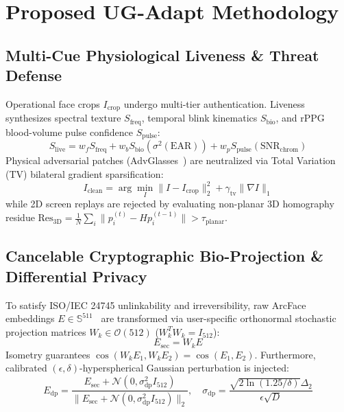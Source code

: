 \documentclass[conference]{IEEEtran}
\begin{document}
\section{Proposed UG-Adapt Methodology}

\subsection{Multi-Cue Physiological Liveness \& Threat Defense}
Operational face crops $I_{\text{crop}}$ undergo multi-tier authentication. Liveness synthesizes spectral texture $S_{\text{freq}}$, temporal blink kinematics $S_{\text{bio}}$, and rPPG blood-volume pulse confidence $S_{\text{pulse}}$:
\begin{equation}
S_{\text{live}} = w_f S_{\text{freq}} + w_b S_{\text{bio}}(\sigma^2(\text{EAR})) + w_p S_{\text{pulse}}(\text{SNR}_{\text{chrom}})
\end{equation}
Physical adversarial patches (AdvGlasses~\cite{sharif2016accessorize}) are neutralized via Total Variation (TV) bilateral gradient sparsification:
\begin{equation}
I_{\text{clean}} = \arg\min_{I} \|I - I_{\text{crop}}\|_2^2 + \gamma_{\text{tv}} \|\nabla I\|_1
\end{equation}
while 2D screen replays are rejected by evaluating non-planar 3D homography residue $\text{Res}_{3\text{D}} = \frac{1}{N}\sum_i \|p_i^{(t)} - H p_i^{(t-1)}\| > \tau_{\text{planar}}$.

\subsection{Cancelable Cryptographic Bio-Projection \& Differential Privacy}
To satisfy ISO/IEC 24745 unlinkability and irreversibility, raw ArcFace embeddings $E \in \mathbb{S}^{511}$~\cite{deng2019arcface} are transformed via user-specific orthonormal stochastic projection matrices $W_k \in \mathcal{O}(512)$ ($W_k^T W_k = I_{512}$):
\begin{equation}
E_{\text{sec}} = W_k E
\end{equation}
Isometry guarantees $\cos(W_k E_1, W_k E_2) = \cos(E_1, E_2)$. Furthermore, calibrated $(\epsilon, \delta)$-hyperspherical Gaussian perturbation is injected:
\begin{equation}
E_{\text{dp}} = \frac{E_{\text{sec}} + \mathcal{N}\left(0, \sigma_{\text{dp}}^2 I_{512}\right)}{\|E_{\text{sec}} + \mathcal{N}\left(0, \sigma_{\text{dp}}^2 I_{512}\right)\|_2}, \quad \sigma_{\text{dp}} = \frac{\sqrt{2\ln(1.25/\delta)}\Delta_2}{\epsilon \sqrt{D}}
\end{equation}
\end{document}
